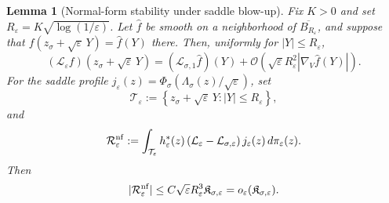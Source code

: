 \documentclass[11pt]{article}
\numberwithin{equation}{section}
\theoremstyle{plain}
\newtheorem{lemma}[theorem]{Lemma}
\theoremstyle{definition}
\theoremstyle{remark}
\newcommand{\eps}{\varepsilon}
\newcommand{\calL}{\mathcal L}
\begin{document}
\begin{lemma}[Normal-form stability under saddle blow-up]
\label{lem:normal-form-stability-saddle-blowup}
Fix $K>0$ and set $R_\eps=K\sqrt{\log(1/\eps)}$.  Let
$\widehat f$ be smooth on a neighborhood of $\overline{B_{R_\eps}}$, and
suppose that $f(z_\sigma+\sqrt\eps\,Y)=\widehat f(Y)$ there.  Then,
uniformly for $|Y|\le R_\eps$,
\[
(\calL_\eps f)\left(z_\sigma+\sqrt\eps\,Y\right)
=(\calL_{\sigma,1}\widehat f)(Y)+\mathcal O\left(\sqrt\eps R_\eps^2|\nabla_V\widehat f(Y)|\right).
\]
For the saddle profile
$j_\eps(z)=\Phi_\sigma(\Lambda_\sigma(z)/\sqrt\eps)$, set
\begin{equation}
\label{eq:normal-form-logarithmic-tube}
\mathcal T_\eps
:=
\left\{z_\sigma+\sqrt\eps\,Y:|Y|\le R_\eps\right\},
\end{equation}
and
\[
\mathcal R_\eps^{\rm nf}
:=
\int_{\mathcal T_\eps}h_\eps^*(z)
\left(\calL_\eps-\calL_{\sigma,\eps}\right)j_\eps(z)\,d\pi_\eps(z).
\]
Then
\[
|\mathcal R_\eps^{\rm nf}|
\le C\sqrt\eps R_\eps^3\mathfrak K_{\sigma,\eps}
=o_\eps(\mathfrak K_{\sigma,\eps}).
\]
\end{lemma}
\end{document}
